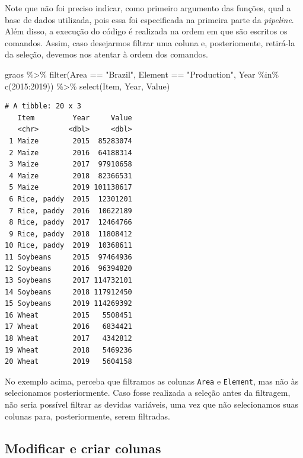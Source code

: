 \documentclass[
  brazilian,
]{book}
\newenvironment{Shaded}{\begin{snugshade}}{\end{snugshade}}
\newcommand{\DecValTok}[1]{\textcolor[rgb]{0.00,0.00,0.81}{#1}}
\newcommand{\FunctionTok}[1]{\textcolor[rgb]{0.00,0.00,0.00}{#1}}
\newcommand{\NormalTok}[1]{#1}
\newcommand{\SpecialCharTok}[1]{\textcolor[rgb]{0.00,0.00,0.00}{#1}}
\newcommand{\StringTok}[1]{\textcolor[rgb]{0.31,0.60,0.02}{#1}}
\begin{document}
Note que não foi preciso indicar, como primeiro argumento das funções, qual a base de dados utilizada, pois essa foi especificada na primeira parte da \emph{pipeline}. Além disso, a execução do código é realizada na ordem em que são escritos os comandos. Assim, caso desejarmos filtrar uma coluna e, posteriomente, retirá-la da seleção, devemos nos atentar à ordem dos comandos.

\begin{Shaded}
\begin{Highlighting}[]
\NormalTok{graos }\SpecialCharTok{\%\textgreater{}\%} 
  \FunctionTok{filter}\NormalTok{(Area }\SpecialCharTok{==} \StringTok{"Brazil"}\NormalTok{,}
\NormalTok{         Element }\SpecialCharTok{==} \StringTok{"Production"}\NormalTok{,}
\NormalTok{         Year }\SpecialCharTok{\%in\%} \FunctionTok{c}\NormalTok{(}\DecValTok{2015}\SpecialCharTok{:}\DecValTok{2019}\NormalTok{)) }\SpecialCharTok{\%\textgreater{}\%} 
  \FunctionTok{select}\NormalTok{(Item, Year, Value)}
\end{Highlighting}
\end{Shaded}

\begin{verbatim}
# A tibble: 20 x 3
   Item         Year     Value
   <chr>       <dbl>     <dbl>
 1 Maize        2015  85283074
 2 Maize        2016  64188314
 3 Maize        2017  97910658
 4 Maize        2018  82366531
 5 Maize        2019 101138617
 6 Rice, paddy  2015  12301201
 7 Rice, paddy  2016  10622189
 8 Rice, paddy  2017  12464766
 9 Rice, paddy  2018  11808412
10 Rice, paddy  2019  10368611
11 Soybeans     2015  97464936
12 Soybeans     2016  96394820
13 Soybeans     2017 114732101
14 Soybeans     2018 117912450
15 Soybeans     2019 114269392
16 Wheat        2015   5508451
17 Wheat        2016   6834421
18 Wheat        2017   4342812
19 Wheat        2018   5469236
20 Wheat        2019   5604158
\end{verbatim}

No exemplo acima, perceba que filtramos as colunas \texttt{Area} e \texttt{Element}, mas não às selecionamos posteriormente. Caso fosse realizada a seleção antes da filtragem, não seria possível filtrar as devidas variáveis, uma vez que não selecionamos suas colunas para, posteriormente, serem filtradas.

\hypertarget{modificar-e-criar-colunas}{%
\subsection{Modificar e criar colunas}\label{modificar-e-criar-colunas}}
\end{document}
